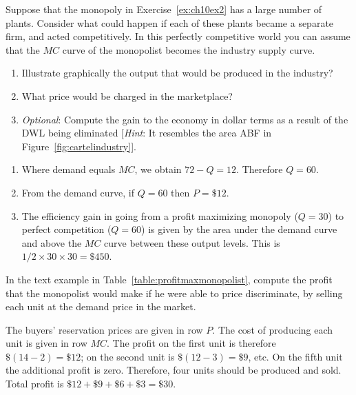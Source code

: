 \begin{enumialphparenastyle}
\begin{econex}\label{ex:ch10ex3}
Suppose that the monopoly in Exercise~\ref{ex:ch10ex2} has a large number of plants. Consider what could happen if each of these plants became a separate firm, and acted competitively. In this perfectly competitive world you can assume that the $MC$ curve of the monopolist becomes the industry supply curve.
\begin{enumerate}
\item	Illustrate graphically the output that would be produced in the industry? 
\item	What price would be charged in the marketplace?
\item	\textit{Optional}: Compute the gain to the economy in dollar terms as a result of the DWL being eliminated [\textit{Hint}: It resembles the area ABF in Figure~\ref{fig:cartelindustry}].
\end{enumerate}
\begin{econsolution}
\begin{enumerate}
\item	Where demand equals $MC$, we obtain $72-Q=12$. Therefore $Q=60$.
\item	From the demand curve, if $Q=60$ then $P=\$12$.
\item	The efficiency gain in going from a profit maximizing monopoly ($Q=30$) to perfect competition ($Q=60$) is given by the area under the demand curve and above the $MC$ curve between these output levels. This is $1/2\times 30\times 30=\$450$.
\end{enumerate}
\end{econsolution}
\end{econex}

\begin{econex}\label{ex:ch10ex4}
In the text example in Table~\ref{table:profitmaxmonopolist}, compute the profit that the monopolist would make if he were able to price discriminate, by selling each unit at the demand price in the market.
\begin{econsolution}
The buyers' reservation prices are given in row $P$. The cost of producing each unit is given in row $MC$. The profit on the first unit is therefore $\$(14-2)=\$12$; on the second unit is $\$(12-3)=\$9$, etc. On the fifth unit the additional profit is zero. Therefore, four units should be produced and sold. Total profit is $\$12+\$9+\$6+\$3=\$30$.

\end{econsolution}
\end{econex}


\end{enumialphparenastyle}
